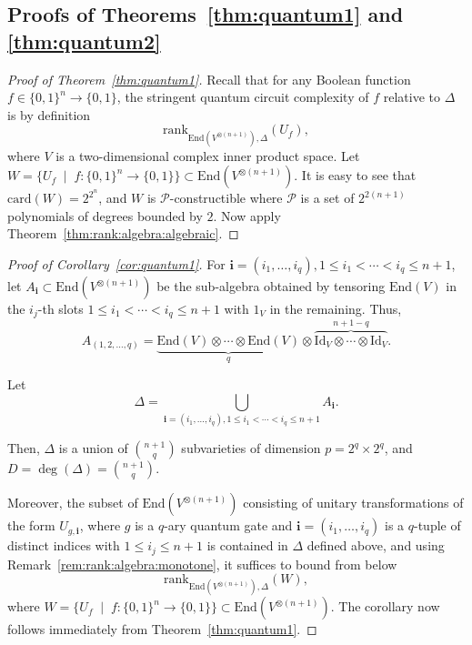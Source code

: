 \documentclass[10pt]{amsart}
\theoremstyle{definition}
\theoremstyle{remark}
\numberwithin{equation}{section}
\newcommand{\card}{\mathrm{card}}
\newcommand{\rank}{\mathrm{rank}}
\newcommand{\End}{\mathrm{End}}
\begin{document}
\subsection{Proofs of Theorems~\ref{thm:quantum1}
and \ref{thm:quantum2}}

\begin{proof}[Proof of Theorem~\ref{thm:quantum1}]
    Recall that for any Boolean function $f \in \{0,1\}^n \rightarrow \{0,1\}$, the stringent quantum circuit complexity of $f$ relative to $\Delta$ is by definition 
    \[
    \rank_{\End(V^{\otimes (n+1)}),\Delta}(U_f),
    \]
    where $V$ is a two-dimensional complex inner product space.
    Let $W = \{U_f \;\mid\; f: \{0,1\}^n \rightarrow \{0,1\}\} \subset \End(V^{\otimes (n+1)})$.
    It is easy to see that $\card(W) = 2^{2^n}$, and $W$ is $\mathcal{P}$-constructible where $\mathcal{P}$ is a set of $2^{2(n+1)}$ polynomials
    of degrees bounded by 
    $2$. Now apply Theorem~\ref{thm:rank:algebra:algebraic}.
\end{proof}

\begin{proof}[Proof of Corollary~\ref{cor:quantum1}]
For $\mathbf{i} = (i_1,\ldots,i_q), 1 \leq i_1 <\cdots <i_q \leq n+1$,
let 
$A_{\mathbf{i}} \subset  \End(V^{\otimes (n+1)})$ 
be the sub-algebra obtained by tensoring $\End(V)$ in the $i_j$-th slots
$1 \leq i_1 < \cdots < i_{q} \leq n+1$ with $1_V$ in the remaining. 
Thus, 
\[
A_{(1,2,\ldots,q)} = \underbrace{\End(V) \otimes \cdots \otimes \End(V)}_{q} \otimes \overbrace{\mathrm{Id}_V \otimes \cdots \otimes \mathrm{Id}_V}^{n+1-q}.
\]

Let 
\[
\Delta = \bigcup_{\mathbf{i} = (i_1,\ldots,i_q), 1 \leq i_1 <\cdots <i_q \leq n+1} A_{\mathbf{i}}.
\]

Then, $\Delta$ is a union of $\binom{n+1}{q}$ subvarieties of 
dimension $p = 2^q \times 2^q$, and $D = \deg(\Delta) = \binom{n+1}{q}$.

Moreover, the subset of $\End(V^{\otimes (n+1)})$ consisting of unitary transformations of the form $U_{g,\mathbf{i}}$, where 
$g$ is a $q$-ary quantum gate and $\mathbf{i} = (i_1,\ldots,i_q)$ is a $q$-tuple of distinct indices with
$1 \leq i_j \leq n+1$ is contained in $\Delta$ defined above,
and using Remark~\ref{rem:rank:algebra:monotone}, it suffices to bound from below 
\[
\rank_{\End (V^{\otimes(n+1)}),\Delta}(W),
\]
where $W = \{U_f \;\mid\; f: \{0,1\}^n \rightarrow \{0,1\}\} \subset \End(V^{\otimes (n+1)})$.
The corollary now follows immediately from Theorem~\ref{thm:quantum1}.
\end{proof}
\end{document}
